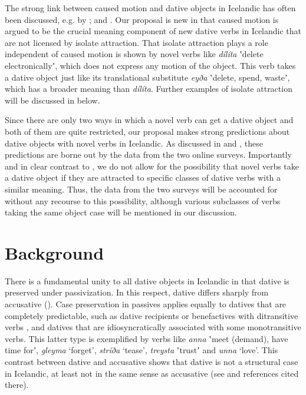 \documentclass[output=paper,modfonts,nonflat,colorlinks,citecolor=brown]{langsci/langscibook}
\begin{document}
The strong link between caused motion and dative objects in Icelandic has often been discussed, e.g. by \citet{Barðdal2001, Barðdal2008, Svenonius2002, Maling2002}; and \citet{Jónsson2013a}. Our proposal is new in that caused motion is argued to be the crucial meaning component of new dative verbs in Icelandic that are not licensed by isolate attraction. That isolate attraction plays a role independent of caused motion is shown by novel verbs like \textit{dílíta} ʽdelete electronicallyʼ, which does not express any motion of the object. This verb takes a dative object just like its translational substitute \textit{eyða} ʽdelete, spend, wasteʼ, which has a broader meaning than \textit{dílíta}. Further examples of isolate attraction will be discussed in  below.

Since there are only two ways in which a novel verb can get a dative object and both of them are quite restricted, our proposal makes strong predictions about dative objects with novel verbs in Icelandic. As discussed in  and , these predictions are borne out by the data from the two online surveys. Importantly and in clear contrast to \citet{Barðdal2001, Barðdal2008}, we do not allow for the possibility that novel verbs take a dative object if they are attracted to specific classes of dative verbs with a similar meaning. Thus, the data from the two surveys will be accounted for without any recourse to this possibility, although various subclasses of verbs taking the same object case will be mentioned in our discussion.

\section{Background} %
\label{sec:jonsson:2}

There is a fundamental unity to all dative objects in Icelandic in that dative is preserved under passivization. In this respect, dative differs sharply from accusative (\citealt{ZaenenMalingThráinsson1985}). Case preservation in passives applies equally to datives that are completely predictable, such as dative recipients or benefactives with ditransitive verbs \citep{Jónsson2000}, and datives that are idiosyncratically associated with some monotransitive verbs. This latter type is exemplified by verbs like \textit{anna} ʽmeet (demand), have time forʼ, \textit{gleyma} ‘forget’, \textit{stríða} ‘tease’, \textit{treysta} ʽtrustʼ and \textit{unna} ‘love’. This contrast between dative and accusative shows that dative is not a structural case in Icelandic, at least not in the same sense as accusative (see \citealt[181--192]{Thráinsson2007} and references cited there).
\end{document}
